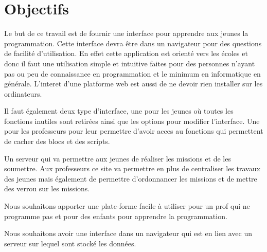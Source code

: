 \section{Objectifs}
\label{intro-objectifs}
Le but de ce travail est de fournir une interface pour apprendre aux jeunes la programmation. Cette interface devra être dans un navigateur pour des questions de facilité d'utilisation. En effet cette application est orienté vers les écoles et donc il faut une utilisation simple et intuitive faites pour des personnes n'ayant pas ou peu de connaissance en programmation et le minimum en informatique en générale. L'interet d'une platforme web est aussi de ne devoir rien installer sur les ordinateurs.

Il faut également deux type d'interface, une pour les jeunes où toutes les fonctions inutiles sont retirées ainsi que les options pour modifier l'interface. Une pour les professeurs pour leur permettre d'avoir acces au fonctions qui permettent de cacher des blocs et des scripts.

Un serveur qui va permettre aux jeunes de réaliser les missions et de les soumettre. Aux professeurs ce site va permettre en plus de centraliser les travaux des jeunes mais également de permettre d'ordonnancer les missions et de mettre des verrou sur les missions.

Nous souhaitons apporter une plate-forme facile à utiliser pour un prof qui ne programme pas et pour des enfants pour apprendre la programmation. 

Nous souhaitons avoir une interface dans un navigateur qui est en lien avec un serveur sur lequel sont stocké les données.
